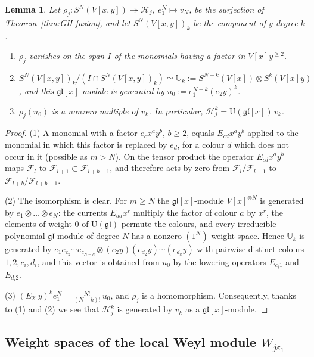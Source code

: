 \documentclass[11pt]{amsart}
\numberwithin{equation}{section}
\newtheorem{lemma}[equation]{Lemma}
\theoremstyle{definition}
\newcommand{\gl}{\mathfrak{gl}}
\newcommand{\U}{\mathrm{U}}
\newcommand{\bU}{\mathbb{U}}
\newcommand{\eps}{\varepsilon}
\begin{document}
	\begin{lemma}\label{lem:y2}
		Let $\rho_j\colon S^N(V[x,y])\twoheadrightarrow\mathcal H_j$, $e_1^N\mapsto v_N$, be the surjection of Theorem~\ref{thm:GH-fusion}, and let $S^N(V[x,y])_k$ be the component of $y$-degree $k$.
		\begin{enumerate}
			\item $\rho_j$ vanishes on the span $I$ of the monomials having a factor in $V[x]y^{\ge2}$.
			\item $S^N(V[x,y])_k/(I\cap S^N(V[x,y])_k)\simeq\bU_k:=S^{N-k}(V[x])\otimes S^k(V[x]y)$, and this $\gl[x]$-module is generated by $u_0:=e_1^{N-k}(e_2y)^k$.
			\item $\rho_j(u_0)$ is a nonzero multiple of $v_k$. In particular, $\mathcal H_j^k=\U(\gl[x])\,v_k$.
		\end{enumerate}
	\end{lemma}
	\begin{proof}
		(1) A monomial with a factor $e_c x^a y^b$, $b\ge2$, equals $E_{cd}x^a y^b$ applied to the monomial in which this factor is replaced by $e_d$, for a colour $d$ which does not occur in it (possible as $m>N$). On the tensor product the operator $E_{cd}x^a y^b$ maps $\mathcal F_l$ to $\mathcal F_{l+1}\subset\mathcal F_{l+b-1}$, and therefore acts by zero from $\mathcal F_l/\mathcal F_{l-1}$ to $\mathcal F_{l+b}/\mathcal F_{l+b-1}$.
		
		(2) The isomorphism is clear. For $m\ge N$ the $\gl[x]$-module $V[x]^{\otimes N}$ is generated by $e_1\otimes\dots\otimes e_N$: the currents $E_{aa}x^r$ multiply the factor of colour $a$ by $x^r$, the elements of weight $0$ of $\U(\gl)$ permute the colours, and every irreducible polynomial $\gl$-module of degree $N$ has a nonzero $(1^N)$-weight space. Hence $\bU_k$ is generated by $e_1e_{c_2}\cdots e_{c_{N-k}}\otimes(e_2y)(e_{d_2}y)\cdots(e_{d_k}y)$ with pairwise distinct colours $1,2,c_i,d_i$, and this vector is obtained from $u_0$ by the lowering operators $E_{c_i1}$ and $E_{d_i2}$.
		
		(3) $(E_{21}y)^ke_1^N=\frac{N!}{(N-k)!}\,u_0$, and $\rho_j$ is a homomorphism. Consequently, thanks to (1) and (2) we see that $\mathcal{H}_j^k$ is generated by $v_k$ as a $\gl[x]$-module.
	\end{proof}
	
	
	\subsection{Weight spaces of the local Weyl module $W_{j\eps_1}$}
	
\end{document}

